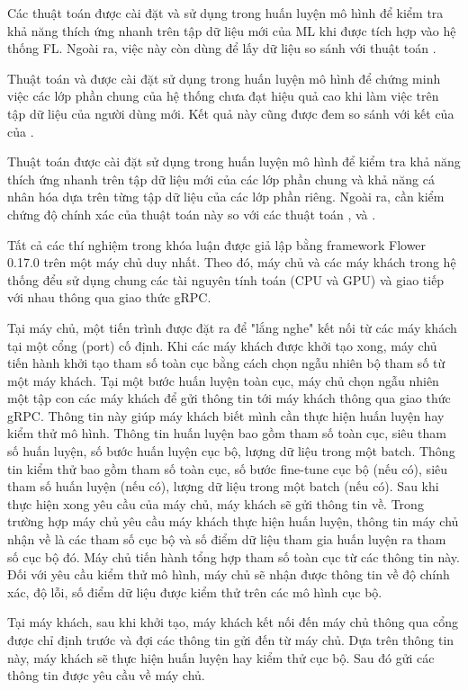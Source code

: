 Các thuật toán  được cài đặt và sử dụng trong huấn luyện mô hình để kiểm tra khả năng thích ứng nhanh trên tập dữ liệu mới của ML khi được tích hợp vào hệ thống FL. Ngoài ra, việc này còn dùng để lấy dữ liệu so sánh với thuật toán .

Thuật toán  và  được cài đặt sử dụng trong huấn luyện mô hình để chứng minh việc các lớp phần chung của hệ thống chưa đạt hiệu quả cao khi làm việc trên tập dữ liệu của người dùng mới. Kết quả này cũng được đem so sánh với kết của của .

Thuật toán  được cài đặt sử dụng trong huấn luyện mô hình để kiểm tra khả năng thích ứng nhanh trên tập dữ liệu mới của các lớp phần chung và khả năng cá nhân hóa dựa trên từng tập dữ liệu của các lớp phần riêng. Ngoài ra, cần kiểm chứng độ chính xác của thuật toán này so với các thuật toán ,  và .

Tất cả các thí nghiệm trong khóa luận được giả lập bằng framework Flower 0.17.0 \cite{beutel2020flower} trên một máy chủ duy nhất. Theo đó, máy chủ và các máy khách trong hệ thống đểu sử dụng chung các tài nguyên tính toán (CPU và GPU) và giao tiếp với nhau thông qua giao thức gRPC.

Tại máy chủ, một tiến trình được đặt ra để "lắng nghe" kết nối từ các máy khách tại một cổng (port) cố định. Khi các máy khách được khởi tạo xong, máy chủ tiến hành khởi tạo tham số toàn cục bằng cách chọn ngẫu nhiên bộ tham số từ một máy khách. Tại một bước huấn luyện toàn cục, máy chủ chọn ngẫu nhiên một tập con các máy khách để gửi thông tin tới máy khách thông qua giao thức gRPC. Thông tin này giúp máy khách biết mình cần thực hiện huấn luyện hay kiểm thử mô hình. Thông tin huấn luyện bao gồm tham số toàn cục, siêu tham số huấn luyện, số bước huấn luyện cục bộ, lượng dữ liệu trong một batch. Thông tin kiểm thử bao gồm tham số toàn cục, số bước fine-tune cục bộ (nếu có), siêu tham số huấn luyện (nếu có), lượng dữ liệu trong một batch (nếu có). Sau khi thực hiện xong yêu cầu của máy chủ, máy khách sẽ gửi thông tin về. Trong trường hợp máy chủ yêu cầu máy khách thực hiện huấn luyện, thông tin máy chủ nhận về là các tham số cục bộ và số điểm dữ liệu tham gia huấn luyện ra tham số cục bộ đó. Máy chủ tiến hành tổng hợp tham số toàn cục từ các thông tin này. Đối với yêu cầu kiểm thử mô hình, máy chủ sẽ nhận được thông tin về độ chính xác, độ lỗi, số điểm dữ liệu được kiểm thử trên các mô hình cục bộ.

Tại máy khách, sau khi khởi tạo, máy khách kết nối đến máy chủ thông qua cổng được chỉ định trước và đợi các thông tin gửi đến từ máy chủ. Dựa trên thông tin này, máy khách sẽ thực hiện huấn luyện hay kiểm thử cục bộ. Sau đó gửi các thông tin được yêu cầu về máy chủ.
